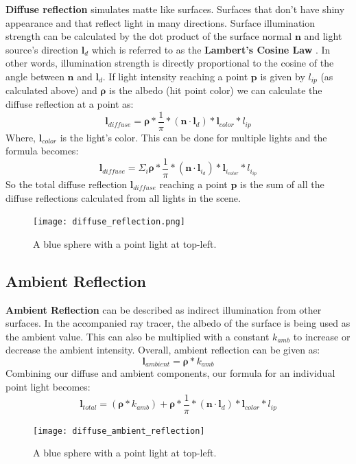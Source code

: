 \documentclass[11pt,a4paper]{article}
\begin{document}
	\textbf{Diffuse reflection} simulates matte like surfaces. Surfaces that don't have shiny appearance and that reflect light in many directions. Surface illumination strength can be calculated by the dot product of the surface normal $\boldsymbol{n}$ and light source's direction $\boldsymbol{l}_{d}$ which is referred to as the \textbf{Lambert's Cosine Law} \cite{lambertscosinelaw}. In other words, illumination strength is directly proportional to the cosine of the angle between $\boldsymbol{n}$ and $\boldsymbol{l}_{d}$. If light intensity reaching a point $\boldsymbol{p}$ is given by $l_{ip}$ (as calculated above) and $\boldsymbol{\rho}$ is the albedo (hit point color) we can calculate the diffuse reflection at a point as:
	\begin{equation}
		\boldsymbol{l}_{diffuse} = \boldsymbol{\rho} * \frac{1}{\pi} * (\boldsymbol{n} \cdot \boldsymbol{l}_{d}) * \boldsymbol{l}_{color} * l_{ip}
	\end{equation}
	Where, $\boldsymbol{l}_{color}$ is the light's color. This can be done for multiple lights and the formula becomes:
	\begin{equation}
		\boldsymbol{l}_{diffuse} = \Sigma_{i} \boldsymbol{\rho} * \frac{1}{\pi} * (\boldsymbol{n} \cdot \boldsymbol{l}_{i_{d}}) * \boldsymbol{l}_{i_{color}} * l_{i_{ip}}
	\end{equation}
	So the total diffuse reflection $\boldsymbol{l}_{diffuse}$ reaching a point $\boldsymbol{p}$ is the sum of all the diffuse reflections calculated from all lights in the scene.
	\begin{figure}[H]
		\centering
		\captionsetup{justification=centering}
		\texttt{[image: diffuse\_reflection.png]}\quad
		\caption{A blue sphere with a point light at top-left.}
	\end{figure}
	
	\subsection{Ambient Reflection}
	\textbf{Ambient Reflection} can be described as indirect illumination from other surfaces. In the accompanied ray tracer, the albedo of the surface is being used as the ambient value. This can also be multiplied with a constant $k_{amb}$ to increase or decrease the ambient intensity. Overall, ambient reflection can be given as:
	\begin{equation}
		\boldsymbol{l}_{ambient} = \boldsymbol{\rho} * k_{amb}
	\end{equation}
	Combining our diffuse and ambient components, our formula for an individual point light becomes:
	\begin{equation}
		\boldsymbol{l}_{total} = (\boldsymbol{\rho} * k_{amb}) + \boldsymbol{\rho} * \frac{1}{\pi} * (\boldsymbol{n} \cdot \boldsymbol{l}_{d}) * \boldsymbol{l}_{color} * l_{ip}
	\end{equation}
	\begin{figure}[H]
		\centering
		\captionsetup{justification=centering}
		\texttt{[image: diffuse\_ambient\_reflection]}\quad
		\caption{A blue sphere with a point light at top-left.}
	\end{figure}
	
\end{document}
